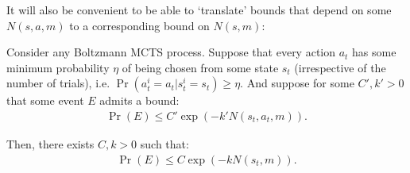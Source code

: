     
        It will also be convenient to be able to `translate' bounds that depend on some $N(s,a,m)$ to a corresponding bound on $N(s,m)$:
        \begin{lemma} \label{lem:sa_to_s}
            Consider any Boltzmann MCTS process. Suppose that every action $a_t$ has some minimum probability $\eta$ of being chosen from some state $s_t$ (irrespective of the number of trials), i.e. $\Pr(a^i_t=a_t|s^i_t=s_t)\geq\eta$. And suppose for some $C',k'>0$ that some event $E$ admits a bound:
            \begin{align}
                \Pr(E) \leq C'\exp(-k'N(s_t,a_t,m)). \label{eq:sa_to_s_assume_bound}
            \end{align}
            
            Then, there exists $C,k>0$ such that:
            \begin{align}
                \Pr(E) \leq C\exp(-k N(s_t,m)). 
            \end{align}
        \end{lemma}
        
